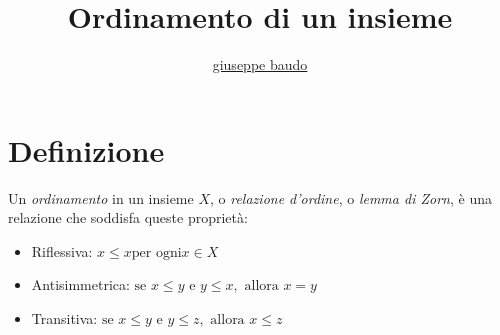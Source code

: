 \documentclass[a4paper,10pt]{article}
\title{Ordinamento di un insieme}
\author{\href{http://www.baudo.hol.es}{giuseppe baudo}}
\begin{document}
\maketitle

\section{Definizione}
Un \textit{ordinamento} in un insieme $X$, o \textit{relazione d'ordine}, o \textit{lemma di Zorn}, è una relazione che soddisfa queste proprietà:
\begin{itemize}
 \item Riflessiva: $x \leq x \text{per ogni} x \in X$
 \item Antisimmetrica: $\text{se } x \leq y \text{ e } y \leq x, \text{ allora } x=y$
 \item Transitiva: $\text{se } x \leq y \text{ e } y \leq z, \text{ allora } x \leq z$
\end{itemize}
\end{document}
